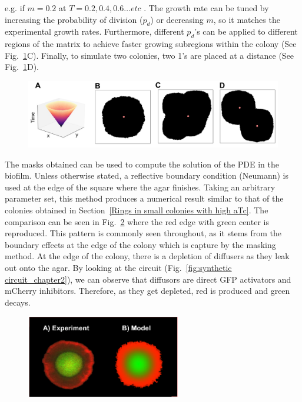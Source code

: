 e.g. if $m=0.2$ at $T=0.2, 0.4, 0.6 \ldots etc$ .
The growth rate can be tuned by increasing the probability of division ($p_d$) or decreasing $m$, so it matches the experimental growth rates. Furthermore, different $p_d$’s can be applied to different regions of the matrix to achieve faster growing subregions within the colony (See Fig.~\ref{cas}C). Finally, to simulate two colonies, two 1’s are placed at a distance (See Fig.~\ref{cas}D).

\begin{figure}[H]
    \centering

    \includegraphics[width=1\textwidth]{chapters/Chapter 3/cas}
    \caption{}
    \label{cas}
\end{figure}

The masks obtained can be used to compute the solution of the PDE in the biofilm.
Unless otherwise stated, a reflective boundary condition (Neumann) is used at the edge of the square where the agar finishes.
Taking an arbitrary parameter set, this method produces a numerical result similar to that of the colonies obtained in Section~\ref{Rings in small colonies with high aTc}.
The comparison can be seen in Fig.~\ref{small colony experiment vs model} where the red edge with green center is reproduced.
This pattern is commonly seen throughout, as it stems from the boundary effects at the edge of the colony which is capture by the masking method.
At the edge of the colony, there is a depletion of diffusers as they leak out onto the agar.
By looking at the circuit (Fig.~\ref{fig:synthetic circuit_chapter2}), we can observe that diffusors are direct GFP activators and mCherry inhibitors.
Therefore, as they get depleted, red is produced and green decays.
\begin{figure}[H]
    \centering

    \includegraphics[width=0.6\textwidth]{chapters/Chapter 3/small colony experiment vs model}
    \caption{}
    \label{small colony experiment vs model}
\end{figure}

